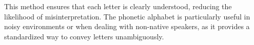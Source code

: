 This method ensures that each letter is clearly understood, reducing the likelihood of misinterpretation. The phonetic alphabet is particularly useful in noisy environments or when dealing with non-native speakers, as it provides a standardized way to convey letters unambiguously.

